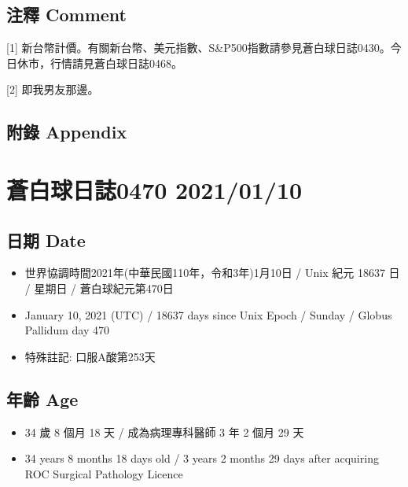 \documentclass[a5paper, 11pt
]{book}
\providecommand{\tightlist}{%
  \setlength{\itemsep}{0pt}\setlength{\parskip}{0pt}}
\begin{document}
\hypertarget{ux6ce8ux91cb-comment-39}{%
\subsection{注釋 Comment}\label{ux6ce8ux91cb-comment-39}}

{[}1{]}
新台幣計價。有關新台幣、美元指數、S\&P500指數請參見蒼白球日誌0430。今日休市，行情請見蒼白球日誌0468。

{[}2{]} 即我男友那邊。

\hypertarget{ux9644ux9304-appendix-39}{%
\subsection{附錄 Appendix}\label{ux9644ux9304-appendix-39}}

\hypertarget{ux84bcux767dux7403ux65e5ux8a8c0470-20210110}{%
\section{蒼白球日誌0470
2021/01/10}\label{ux84bcux767dux7403ux65e5ux8a8c0470-20210110}}

\hypertarget{ux65e5ux671f-date-40}{%
\subsection{日期 Date}\label{ux65e5ux671f-date-40}}

\begin{itemize}
\tightlist
\item
  世界協調時間2021年(中華民國110年，令和3年)1月10日 / Unix 紀元 18637 日
  / 星期日 / 蒼白球紀元第470日
\item
  January 10, 2021 (UTC) / 18637 days since Unix Epoch / Sunday / Globus
  Pallidum day 470
\item
  特殊註記: 口服A酸第253天
\end{itemize}

\hypertarget{ux5e74ux9f61-age-40}{%
\subsection{年齡 Age}\label{ux5e74ux9f61-age-40}}

\begin{itemize}
\tightlist
\item
  34 歲 8 個月 18 天 / 成為病理專科醫師 3 年 2 個月 29 天
\item
  34 years 8 months 18 days old / 3 years 2 months 29 days after
  acquiring ROC Surgical Pathology Licence
\end{itemize}
\end{document}

